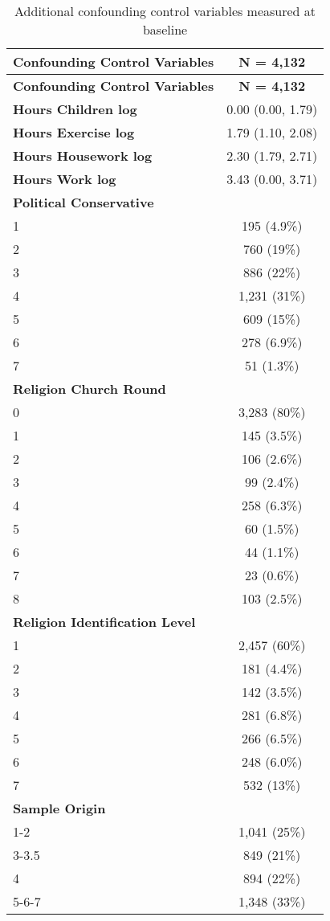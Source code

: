 \documentclass[
  singlecolumn,
  9pt]{article}
\begin{document}
\hypertarget{tbl-table_confounding_control_vars_dogs}{}
\begin{longtable}[]{@{}lc@{}}
\caption{\label{tbl-table_confounding_control_vars_dogs}Additional
confounding control variables measured at baseline}\tabularnewline
\toprule\noalign{}
\textbf{Confounding Control Variables} & \textbf{N = 4,132} \\
\midrule\noalign{}
\endfirsthead
\toprule\noalign{}
\textbf{Confounding Control Variables} & \textbf{N = 4,132} \\
\midrule\noalign{}
\endhead
\bottomrule\noalign{}
\endlastfoot
\textbf{Hours Children log} & 0.00 (0.00, 1.79) \\
\textbf{Hours Exercise log} & 1.79 (1.10, 2.08) \\
\textbf{Hours Housework log} & 2.30 (1.79, 2.71) \\
\textbf{Hours Work log} & 3.43 (0.00, 3.71) \\
\textbf{Political Conservative} & \\
1 & 195 (4.9\%) \\
2 & 760 (19\%) \\
3 & 886 (22\%) \\
4 & 1,231 (31\%) \\
5 & 609 (15\%) \\
6 & 278 (6.9\%) \\
7 & 51 (1.3\%) \\
\textbf{Religion Church Round} & \\
0 & 3,283 (80\%) \\
1 & 145 (3.5\%) \\
2 & 106 (2.6\%) \\
3 & 99 (2.4\%) \\
4 & 258 (6.3\%) \\
5 & 60 (1.5\%) \\
6 & 44 (1.1\%) \\
7 & 23 (0.6\%) \\
8 & 103 (2.5\%) \\
\textbf{Religion Identification Level} & \\
1 & 2,457 (60\%) \\
2 & 181 (4.4\%) \\
3 & 142 (3.5\%) \\
4 & 281 (6.8\%) \\
5 & 266 (6.5\%) \\
6 & 248 (6.0\%) \\
7 & 532 (13\%) \\
\textbf{Sample Origin} & \\
1-2 & 1,041 (25\%) \\
3-3.5 & 849 (21\%) \\
4 & 894 (22\%) \\
5-6-7 & 1,348 (33\%) \\
\end{longtable}
\end{document}
